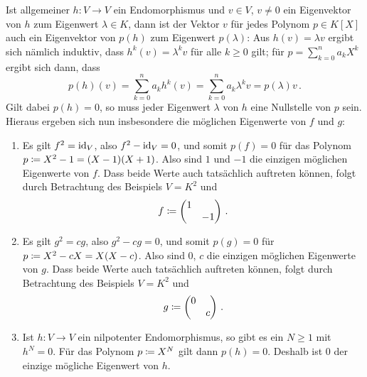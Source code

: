 \section{}





\subsection{}

Ist allgemeiner $h \colon V \to V$ ein Endomorphismus und $v \in V$, $v \neq 0$ ein Eigenvektor von $h$ zum Eigenwert $\lambda \in K$, dann ist der Vektor $v$ für jedes Polynom $p \in K[X]$ auch ein Eigenvektor von $p(h)$ zum Eigenwert $p(\lambda)$:
Aus $h(v) = \lambda v$ ergibt sich nämlich induktiv, dass $h^k(v) = \lambda^k v$ für alle $k \geq 0$ gilt;
für $p = \sum_{k=0}^n a_k X^k$ ergibt sich dann, dass
\[
    p(h)(v)
  = \sum_{k=0}^n a_k h^k(v)
  = \sum_{k=0}^n a_k \lambda^k v
  = p(\lambda) v \,.
\]
Gilt dabei $p(h) = 0$, so muss jeder Eigenwert $\lambda$ von $h$ eine Nullstelle von $p$ sein. 
Hieraus ergeben sich nun insbesondere die möglichen Eigenwerte von $f$ und $g$:

\begin{example}
  \leavevmode
  \begin{enumerate}
    \item
      Es gilt $f^2 = \operatorname{id}_V$, also $f^2 - \operatorname{id}_V = 0$, und somit $p(f) = 0$ für das Polynom $p \coloneqq X^2 - 1 = (X-1)(X+1)$.
      Also sind $1$ und $-1$ die einzigen möglichen Eigenwerte von $f$.
      Dass beide Werte auch tatsächlich auftreten können, folgt durch Betrachtung des Beispiels $V = K^2$ und
      \[
                  f
        \coloneqq  \begin{pmatrix}
                    1 &     \\
                      & -1
                  \end{pmatrix} \,.
      \]
    \item
      Es gilt $g^2 = cg$, also $g^2 - cg = 0$, und somit $p(g) = 0$ für $p \coloneqq X^2 - cX = X(X-c)$.
      Also sind $0$, $c$ die einzigen möglichen Eigenwerte von $g$.
      Dass beide Werte auch tatsächlich auftreten können, folgt durch Betrachtung des Beispiels $V = K^2$ und
      \[
                  g
        \coloneqq  \begin{pmatrix}
                    0 &   \\
                      & c
                  \end{pmatrix} \,.
      \]
    \item
      Ist $h \colon V \to V$ ein nilpotenter Endomorphismus, so gibt es ein $N \geq 1$ mit $h^N = 0$.
      Für das Polynom $p \coloneqq X^N$ gilt dann $p(h) = 0$.
      Deshalb ist $0$ der einzige mögliche Eigenwert von $h$.
  \end{enumerate}
\end{example}





